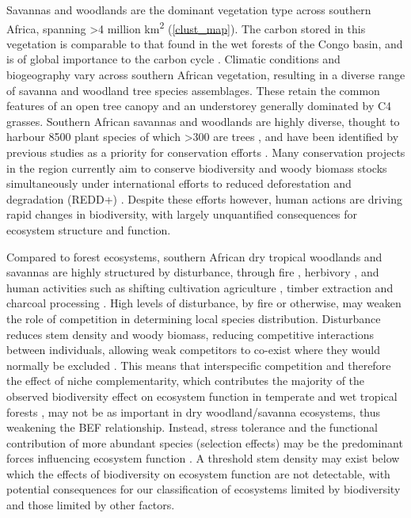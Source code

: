 \documentclass[11pt,a4paper]{article}
\newcommand{\textapprox}{\raisebox{0.5ex}{\texttildelow}}  %
\begin{document}
Savannas and woodlands are the dominant vegetation type across southern Africa, spanning >4 million km\textsuperscript{2} \citep{White1987, Ratnam2011, Ryan2016} (\autoref{clust_map}). The carbon stored in this vegetation is comparable to that found in the wet forests of the Congo basin, and is of global importance to the carbon cycle \citep{Houghton2009, Mayaux2008}. Climatic conditions and biogeography vary across southern African vegetation, resulting in a diverse range of savanna and woodland tree species assemblages. These retain the common features of an open tree canopy and an understorey generally dominated by C4 grasses. Southern African savannas and woodlands are highly diverse, thought to harbour \textapprox{}8500 plant species of which >300 are trees \citep{Frost1996}, and have been identified by previous studies as a priority for conservation efforts \citep{Byers2001, Mittermeier2003}. Many conservation projects in the region currently aim to conserve biodiversity and woody biomass stocks simultaneously under international efforts to reduced deforestation and degradation (REDD+) \citep{Hinsley2015}. Despite these efforts however, human actions are driving rapid changes in biodiversity, with largely unquantified consequences for ecosystem structure and function.

Compared to forest ecosystems, southern African dry tropical woodlands and savannas are highly structured by disturbance, through fire \citep{Lehmann2014}, herbivory \citep{Sankaran2008, Levick2009}, and human activities such as shifting cultivation agriculture \citep{Heinimann2017}, timber extraction and charcoal processing \citep{Dewees2010, McNicol2018b}. High levels of disturbance, by fire or otherwise, may weaken the role of competition in determining local species distribution. Disturbance reduces stem density and woody biomass, reducing competitive interactions between individuals, allowing weak competitors to co-exist where they would normally be excluded \citep{Grime1979, Grace1990}. This means that interspecific competition and therefore the effect of niche complementarity, which contributes the majority of the observed biodiversity effect on ecosystem function in temperate and wet tropical forests \citep{Wright2017, Poorter2015, Sande2017a}, may not be as important in dry woodland/savanna ecosystems, thus weakening the BEF relationship. Instead, stress tolerance and the functional contribution of more abundant species (selection effects) may be the predominant forces influencing ecosystem function \citep{Lasky2014, Tobner2016}. A threshold stem density may exist below which the effects of biodiversity on ecosystem function are not detectable, with potential consequences for our classification of ecosystems limited by biodiversity and those limited by other factors.
\end{document}

